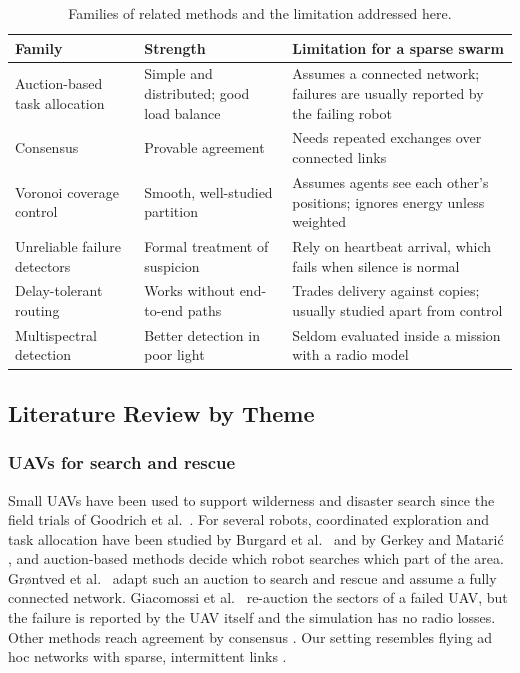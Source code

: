 \documentclass[10pt,letterpaper]{article}
\begin{document}
\begin{table}[H]
\centering\small
\caption{Families of related methods and the limitation addressed here.}\label{tab:related}
\begin{tabular}{p{3.2cm}p{4.9cm}p{6.3cm}}
\toprule
Family & Strength & Limitation for a sparse swarm\\
\midrule
Auction-based task allocation \cite{gerkey2004,grontved2023} & Simple and distributed; good load balance & Assumes a connected network; failures are usually reported by the failing robot\\
Consensus \cite{olfatisaber2007} & Provable agreement & Needs repeated exchanges over connected links\\
Voronoi coverage control \cite{cortes2004coverage,du1999cvt} & Smooth, well-studied partition & Assumes agents see each other's positions; ignores energy unless weighted\\
Unreliable failure detectors \cite{chandra1996,hayashibara2004} & Formal treatment of suspicion & Rely on heartbeat arrival, which fails when silence is normal\\
Delay-tolerant routing \cite{fall2003dtn,vahdat2000epidemic,spyropoulos2005spray} & Works without end-to-end paths & Trades delivery against copies; usually studied apart from control\\
Multispectral detection \cite{hwang2015kaist,jia2021llvip,speth2022} & Better detection in poor light & Seldom evaluated inside a mission with a radio model\\
\bottomrule
\end{tabular}
\end{table}

\subsection{Literature Review by Theme}
\subsubsection*{UAVs for search and rescue}
Small UAVs have been used to support wilderness and disaster search since the field trials of Goodrich et al.\ \cite{goodrich2008}. For several robots, coordinated exploration and task allocation have been studied by Burgard et al.\ \cite{burgard2005} and by Gerkey and Matari\'c \cite{gerkey2004}, and auction-based methods decide which robot searches which part of the area. Gr{\o}ntved et al.\ \cite{grontved2023} adapt such an auction to search and rescue and assume a fully connected network. Giacomossi et al.\ \cite{giacomossi2026} re-auction the sectors of a failed UAV, but the failure is reported by the UAV itself and the simulation has no radio losses. Other methods reach agreement by consensus \cite{olfatisaber2007}. Our setting resembles flying ad hoc networks with sparse, intermittent links \cite{bekmezci2013}.
\end{document}
